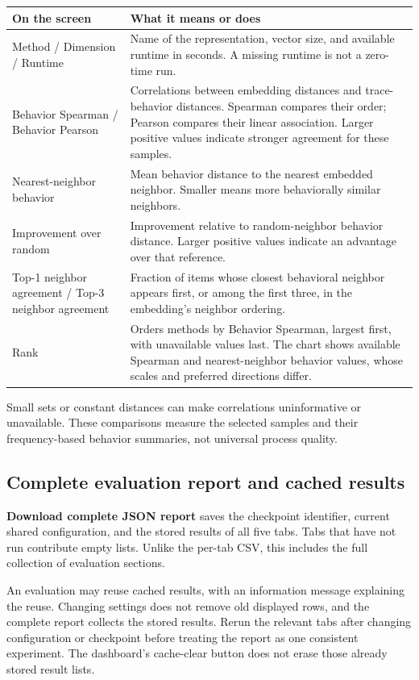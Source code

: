 \documentclass[11pt,a4paper]{article}
\makeatletter
\newcommand{\ui}[1]{\textbf{#1}}
\newenvironment{controls}{%
  \small\begin{longtable}{@{}>{\raggedright\arraybackslash}p{.34\linewidth}
    >{\raggedright\arraybackslash}p{.62\linewidth}@{}}
  \toprule\textbf{On the screen} & \textbf{What it means or does}\\\midrule\endhead
  \bottomrule\endfoot
}{\end{longtable}\normalsize}
\makeatother
\begin{document}
\begin{controls}
Method / Dimension / Runtime & Name of the representation, vector size, and
available runtime in seconds. A missing runtime is not a zero-time run.\\
Behavior Spearman / Behavior Pearson & Correlations between embedding
distances and trace-behavior distances. Spearman compares their order;
Pearson compares their linear association. Larger positive values indicate
stronger agreement for these samples.\\
Nearest-neighbor behavior & Mean behavior distance to the nearest embedded
neighbor. Smaller means more behaviorally similar neighbors.\\
Improvement over random & Improvement relative to random-neighbor behavior
distance. Larger positive values indicate an advantage over that reference.\\
Top-1 neighbor agreement / Top-3 neighbor agreement & Fraction of items whose
closest behavioral neighbor appears first, or among the first three, in the
embedding's neighbor ordering.\\
Rank & Orders methods by Behavior Spearman, largest first, with unavailable
values last. The chart shows available Spearman and nearest-neighbor behavior
values, whose scales and preferred directions differ.\\
\end{controls}

Small sets or constant distances can make correlations uninformative or
unavailable. These comparisons measure the selected samples and their
frequency-based behavior summaries, not universal process quality.

\subsection{Complete evaluation report and cached results}
\ui{Download complete JSON report} saves the checkpoint identifier, current
shared configuration, and the stored results of all five tabs. Tabs that have
not run contribute empty lists. Unlike the per-tab CSV, this includes the full
collection of evaluation sections.

An evaluation may reuse cached results, with an information message explaining
the reuse. Changing settings does not remove old displayed rows, and the
complete report collects the stored results. Rerun the relevant tabs after
changing configuration or checkpoint before treating the report as one
consistent experiment. The dashboard's cache-clear button does not erase
those already stored result lists.
\end{document}
